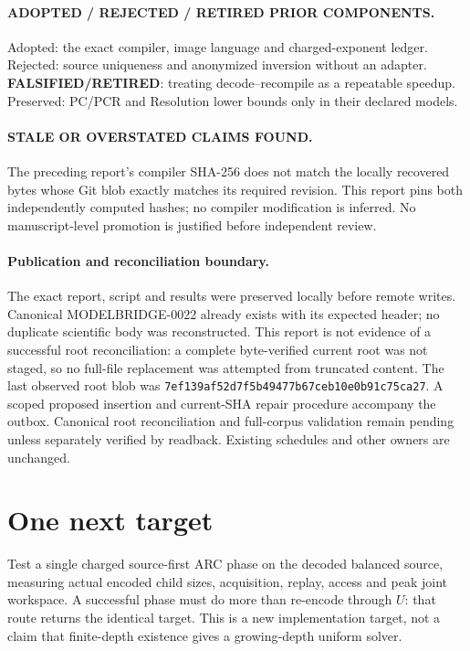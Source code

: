 \documentclass[11pt]{article}
\begin{document}
\paragraph{ADOPTED / REJECTED / RETIRED PRIOR COMPONENTS.}
Adopted: the exact compiler, image language and charged-exponent ledger.
Rejected: source uniqueness and anonymized inversion without an adapter.
\textbf{FALSIFIED/RETIRED}: treating decode--recompile as a repeatable speedup.
Preserved: PC/PCR and Resolution lower bounds only in their declared models.

\paragraph{STALE OR OVERSTATED CLAIMS FOUND.}
The preceding report's compiler SHA-256 does not match the locally recovered
bytes whose Git blob exactly matches its required revision. This report pins
both independently computed hashes; no compiler modification is inferred.
No manuscript-level promotion is justified before independent review.

\paragraph{Publication and reconciliation boundary.}
The exact report, script and results were preserved locally before remote
writes. Canonical MODELBRIDGE-0022 already exists with its expected header;
no duplicate scientific body was reconstructed. This report is not evidence
of a successful root reconciliation: a complete byte-verified current root
was not staged, so no full-file replacement was attempted from truncated
content. The last observed root blob was
\texttt{7ef139af52d7f5b49477b67ceb10e0b91c75ca27}. A scoped proposed insertion
and current-SHA repair procedure accompany the outbox. Canonical root
reconciliation and full-corpus validation remain pending unless separately
verified by readback. Existing schedules and other owners are unchanged.

\section{One next target}
Test a single charged source-first ARC phase on the decoded balanced source,
measuring actual encoded child sizes, acquisition, replay, access and peak
joint workspace. A successful phase must do more than re-encode through $U$:
that route returns the identical target. This is a new implementation target,
not a claim that finite-depth existence gives a growing-depth uniform solver.
\end{document}
